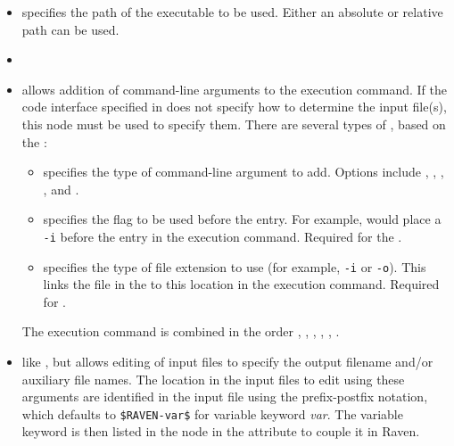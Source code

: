 \subnodesIntro
%
\begin{itemize}
  \item {}  specifies the path
  of the executable to be used.
  \nb Either an absolute or relative path can be used.
  \item {}
  \item {}  allows addition of
  command-line arguments to the execution command.  If the code interface
  specified in   does not specify how to
  determine the input file(s), this node must be used to specify them.
  There are several types of , based on the :
  \begin{itemize}
    \item {}  specifies the type of
    command-line argument to add.  Options include ,
    , , , and
    .
    \item {}  specifies the flag to
    be used before the entry.  For example,  would
    place a \texttt{-i} before the entry in the execution command.  Required for
    the  .
    \item {}  specifies the type
    of file extension to use (for example, \texttt{-i} or \texttt{-o}).  This links the
     file in the  to this location in the execution
    command.  Required for  .
  \end{itemize}
  The execution command is combined in the order ,
  , , , ,
  .
  \item {}  like ,
  but allows editing of input files to specify the output filename and/or auxiliary
  file names.
  The location in the input files to edit using these arguments are identified in
  the input file using the prefix-postfix notation, which defaults to
  \texttt{\$RAVEN-var\$} for variable keyword \emph{var}.  The variable keyword
  is then listed in the  node in the attribute  to
  couple it in Raven.

\end{itemize}
